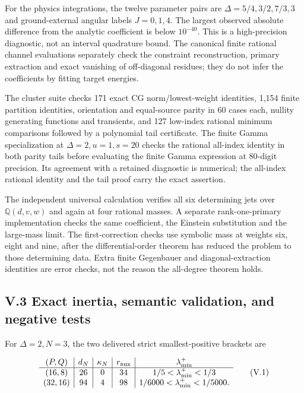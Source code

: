 \documentclass[a4paper,11pt]{article}
\numberwithin{equation}{section}
\begin{document}
For the physics integrations, the twelve parameter pairs are \(\Delta=5/4,3/2,7/3,3\) and ground-external angular labels \(J=0,1,4\). The largest observed absolute difference from the analytic coefficient is below \(10^{-40}\). This is a high-precision diagnostic, not an interval quadrature bound. The canonical finite rational channel evaluations separately check the constraint reconstruction, primary extraction and exact vanishing of off-diagonal residues; they do not infer the coefficients by fitting target energies.

The cluster suite checks 171 exact CG norm/lowest-weight identities, 1,154 finite partition identities, orientation and equal-source parity in 60 cases each, nullity generating functions and transients, and 127 low-index rational minimum comparisons followed by a polynomial tail certificate. The finite Gamma specialization at \(\Delta=2,u=1,s=20\) checks the rational all-index identity in both parity tails before evaluating the finite Gamma expression at 80-digit precision. Its agreement with a retained diagnostic is numerical; the all-index rational identity and the tail proof carry the exact assertion.

The independent universal calculation verifies all six determining jets over \(\mathbb Q(d,v,w)\) and again at four rational masses. A separate rank-one-primary implementation checks the same coefficient, the Einstein substitution and the large-mass limit. The first-correction checks use symbolic mass at weights six, eight and nine, after the differential-order theorem has reduced the problem to those determining data. Extra finite Gegenbauer and diagonal-extraction identities are error checks, not the reason the all-degree theorem holds.

\hypertarget{v.3-exact-inertia-semantic-validation-and-negative-tests}{%
\subsection{V.3 Exact inertia, semantic validation, and negative tests}\label{v.3-exact-inertia-semantic-validation-and-negative-tests}}

For \(\Delta=2,N=3\), the two delivered strict smallest-positive brackets are

\[
\begin{array}{c|c|c|c|c}
(P,Q)&d_N&\kappa_N& r_{\rm aux}&\lambda_{\min}^{+}\\
\hline
(16,8)&26&0&34&1/5<\lambda_{\min}^{+}<1/3\\
(32,16)&94&4&98&1/6000<\lambda_{\min}^{+}<1/5000 .
\end{array}
\tag{V.1}
\]
\end{document}
